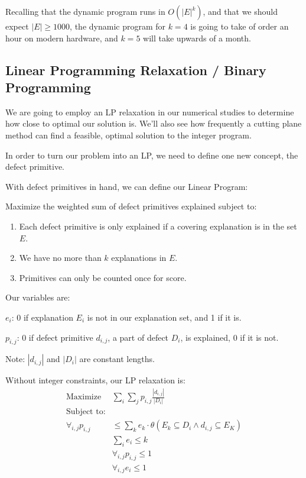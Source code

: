 Recalling that the dynamic program runs in $O(|E|^{k})$, and that we should expect $|E| \geq 1000$, the dynamic program for $k=4$ is going to take of order an hour on modern hardware, and $k=5$ will take upwards of a month.

\subsection{Linear Programming Relaxation / Binary Programming} \label{sec:IP}

We are going to employ an LP relaxation in our numerical studies to determine how close to optimal our solution is.  We'll also see how frequently a cutting plane method can find a feasible, optimal solution to the integer program.

In order to turn our problem into an LP, we need to define one new concept, the defect primitive. 

With defect primitives in hand, we can define our Linear Program:

Maximize the weighted sum of defect primitives explained subject to:

\begin{enumerate}
\item Each defect primitive is only explained if a covering explanation is in the set {\bf $E$}.

\item We have no more than $k$ explanations in {\bf $E$}.

\item Primitives can only be counted once for score.
\end{enumerate}

Our variables are: 

$e_i$: 0 if explanation $E_i$ is not in our explanation set, and 1 if it is.

$p_{i,j}$: 0 if defect primitive $d_{i,j}$, a part of defect $D_i$, is explained, 0 if it is not.

Note: $|d_{i,j}|$ and $|D_i|$ are constant lengths.

Without integer constraints, our LP relaxation is:
\begin{eqnarray*}
  \textrm{Maximize} &\sum_i \sum_j p_{i,j} \frac{|d_{i,j}|}{|D_i|} \\
  \textrm{Subject to:} &\\
  \forall_{i,j} p_{i,j} &\leq \sum_k e_k \cdot \theta(E_k \subseteq D_i \wedge d_{i,j} \subseteq E_K ) \\
  &\sum_i e_i \leq k \\
  &\forall_{i,j} p_{i,j} \leq 1 \\
  &\forall_{i,j} e_i \leq 1 \\
\end{eqnarray*}

